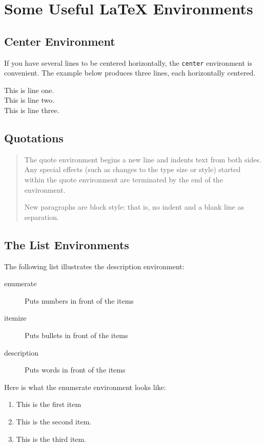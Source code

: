 \documentclass{article}               %
\begin{document}

\section{Some Useful LaTeX Environments}
\subsection{Center Environment}
If you have several lines to be centered horizontally,
the \texttt{center} environment is convenient.  The example below
produces three lines, each horizontally centered.
\begin{center}
  This is line one. \\
  This is line two. \\
  This is line three.
\end{center}

\subsection{Quotations}
\begin{quote}
\small          %
The quote environment begins a new line and indents text from
both sides.
Any special effects (such as changes to the type size or style) 
started within the quote environment are terminated by the end of the environment.

New paragraphs are block style: that is, no indent and a blank line
as separation.
\end{quote}

\subsection{The List Environments}
The following list illustrates the description environment:
\begin{description}
  \item[enumerate] Puts numbers in front of the items
  \item[itemize] Puts bullets in front of the items
  \item[description] Puts words in front of the items
\end{description}

Here is what the enumerate environment looks like:
\begin{enumerate}     
  \item This is the first item
  \item This is the second item.
  \item This is the third item.
\end{enumerate}
\end{document}
